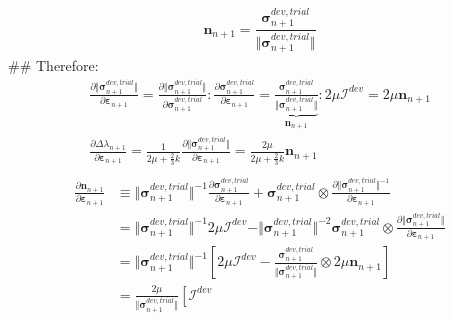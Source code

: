 \documentclass[]{scrartcl}
\begin{document}
\begin{easylist}
\begin{gather*}
\boldsymbol{n}_{n+1}
  = \dfrac{\boldsymbol{\sigma}^{dev, trial}_{n+1}}{\Vert \boldsymbol{\sigma}^{dev, trial}_{n+1} \Vert}
\end{gather*}
## Therefore:
\begin{gather*}
\frac{\partial \Vert \boldsymbol{\sigma}^{dev, trial}_{n+1} \Vert}{\partial \boldsymbol{\varepsilon}_{n+1}}
  = \frac{\partial \Vert \boldsymbol{\sigma}^{dev, trial}_{n+1} \Vert}{\partial \boldsymbol{\sigma}^{dev, trial}_{n+1}} : \frac{\partial \boldsymbol{\sigma}^{dev, trial}_{n+1}}{\partial \boldsymbol{\varepsilon}_{n+1}}
  = \underbrace{\frac{\boldsymbol{\sigma}^{dev, trial}_{n+1}}{\Vert\boldsymbol{\sigma}^{dev, trial}_{n+1}\Vert}}_{\boldsymbol{n}_{n+1}} : 2 \mu \boldsymbol{\mathcal{I}}^{dev}
  = 2 \mu \boldsymbol{n}_{n+1}
\\
\frac{\partial \Delta \lambda_{n+1}}{\partial \boldsymbol{\varepsilon}_{n+1}}
  = \frac{1}{{2 \mu + \frac{2}{3} k}} \frac{\partial \Vert \boldsymbol{\sigma}^{dev, trial}_{n+1} \Vert}{\partial \boldsymbol{\varepsilon}_{n+1}}
  = \frac{2 \mu}{{2 \mu + \frac{2}{3} k}} \boldsymbol{n}_{n+1}  \\
\end{gather*}
\begin{align*}
\frac{\partial \boldsymbol{n}_{n+1}}{\partial \boldsymbol{\varepsilon}_{n+1}}
 &\equiv \Vert \boldsymbol{\sigma}^{dev, trial}_{n+1} \Vert^{-1} \frac{\partial \boldsymbol{\sigma}^{dev, trial}_{n+1}}{\partial \boldsymbol{\varepsilon}_{n+1}} 
  + \boldsymbol{\sigma}^{dev, trial}_{n+1} \otimes \frac{\partial \Vert \boldsymbol{\sigma}^{dev, trial}_{n+1} \Vert^{-1}}{\partial \boldsymbol{\varepsilon}_{n+1}} \\
 &= \Vert \boldsymbol{\sigma}^{dev, trial}_{n+1} \Vert^{-1} 2 \mu \boldsymbol{\mathcal{I}}^{dev} 
  - \Vert \boldsymbol{\sigma}^{dev, trial}_{n+1} \Vert^{-2} \boldsymbol{\sigma}^{dev, trial}_{n+1} \otimes \frac{\partial \Vert \boldsymbol{\sigma}^{dev, trial}_{n+1} \Vert}{\partial \boldsymbol{\varepsilon}_{n+1}} \\
 &= \Vert \boldsymbol{\sigma}^{dev, trial}_{n+1} \Vert^{-1} \left[ 2 \mu \boldsymbol{\mathcal{I}}^{dev} 
  - \frac{\boldsymbol{\sigma}^{dev, trial}_{n+1}}{\Vert \boldsymbol{\sigma}^{dev, trial}_{n+1} \Vert} \otimes 2 \mu \boldsymbol{n}_{n+1} \right] \\
 &= \frac{2\mu}{\Vert \boldsymbol{\sigma}^{dev, trial}_{n+1} \Vert} \left[ \boldsymbol{\mathcal{I}}^{dev} 

\end{align*}
\end{easylist}
\end{document}
